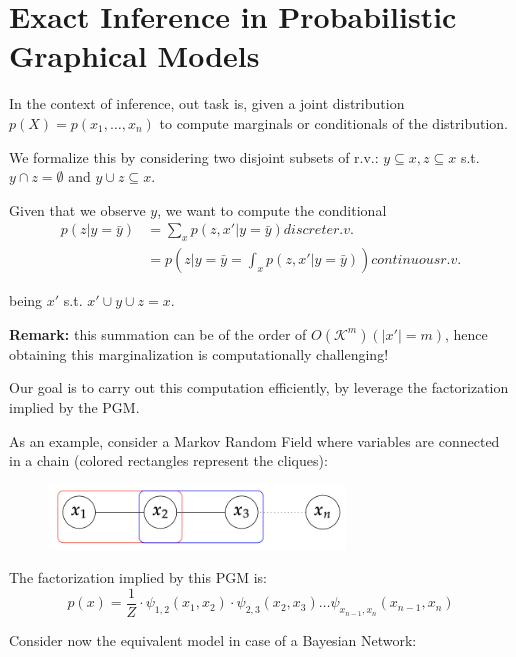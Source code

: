 
\chapter{Exact Inference in Probabilistic Graphical Models}

In the context of inference, out task is, given a joint distribution $p(X) = p(x_1, \dots, x_n)$ to compute marginals or conditionals of the distribution.

We formalize this by considering two disjoint subsets of r.v.: $y \subseteq x, z \subseteq x$ s.t. $y \cap z = \emptyset$ and $y \cup z \subseteq x$.

Given that we observe $y$, we want to compute the conditional
$$
    \begin{array}{rl}
        p(z|y = \bar{y})
        & = \sum_{x}^{}p(z,x'|y = \bar{y}) discrete r.v. \\
        & = p(z|y = \bar{y} = \int_{x}^{}p(z,x'|y = \bar{y})) continuous r.v.
    \end{array}    
$$

being $x'$ s.t. $x' \cup y \cup z = x$.

\textbf{Remark:} this summation can be of the order of $O(\mathcal{K}^m)(|x'|=m)$, hence obtaining this marginalization is computationally challenging!

Our goal is to carry out this computation efficiently, by leverage the factorization implied by the PGM.

As an example, consider a Markov Random Field where variables are connected in a chain (colored rectangles represent the cliques):
\begin{figure}[H]
    \centering
    \includegraphics[width=0.7\textwidth]{assets/fig18.png}
\end{figure}

The factorization implied by this PGM is:
$$
    p(x) = \frac{1}{Z} \cdot \psi_{1,2}(x_1, x_2)\cdot \psi_{2,3}(x_2, x_3)\dots \psi_{x_{n-1}, x_{n}}(x_{n-1}, x_n)
$$

Consider now the equivalent model in case of a Bayesian Network:

\begin{center}
\end{center}

